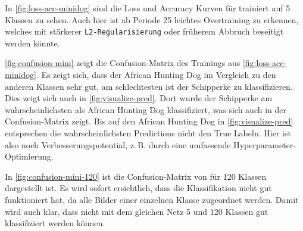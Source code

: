 In \autoref{fig:loss-acc-minidog} sind die Loss und Accuracy Kurven für \MiniDog{}
trainiert auf 5 Klassen zu sehen. Auch hier ist ab Periode 25 leichtes
Overtraining zu erkennen, welches mit stärkerer \texttt{L2-Regularisierung} oder
früherem Abbruch beseitigt werden könnte.

\autoref{fig:confusion-mini} zeigt die Confusion-Matrix des Trainings aus
\autoref{fig:loss-acc-minidog}. Es zeigt sich, dass der African Hunting Dog im
Vergleich zu den anderen Klassen sehr gut, am schlechtesten ist der Schipperke
zu klassifizieren. Dies zeigt sich auch in \autoref{fig:visualize-pred}. Dort
wurde der Schipperke am wahrscheinlichsten als African Hunting Dog
klassifiziert, was sich auch in der Confusion-Matrix zeigt. Bis auf den African
Hunting Dog in \autoref{fig:visualize-pred} entsprechen die wahrscheinlichsten
Predictions nicht den True Labeln. Hier ist also noch Verbesserungspotential,
z.\,B. durch eine umfassende Hyperparameter-Optimierung.

In \autoref{fig:confusion-mini-120} ist die Confusion-Matrix von \MiniDog{} für
120 Klassen dargestellt ist. Es wird sofort ersichtlich, dass die Klassifikation
nicht gut funktioniert hat, da alle Bilder einer einzelnen Klasse zugeordnet
werden. Damit wird auch klar, dass nicht mit dem gleichen Netz 5 und 120 Klassen
gut klassifiziert werden können.

